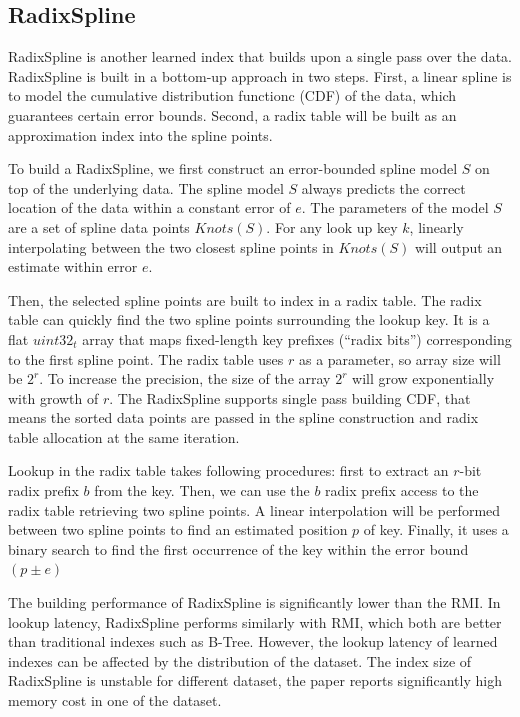 \subsection{RadixSpline}
RadixSpline \cite{Kipf:2020wr} is another learned index that builds upon a single pass over the data. RadixSpline is built in a bottom-up approach in two steps. First, a linear spline is to model the cumulative distribution functionc (CDF) of the data, which guarantees certain error bounds. Second, a radix table will be built as an approximation index into the spline points. 

To build a RadixSpline, we first construct an error-bounded spline model $S$ on top of the underlying data. The spline model $S$ always predicts the correct location of the data within a constant error of $e$. The parameters of the model $S$ are a set of spline data points $Knots(S)$. For any look up key $k$, linearly interpolating between the two closest spline points in $Knots(S)$ will output an estimate within error $e$. 

Then, the selected spline points are built to index in a radix table. The radix table can quickly find the two spline points surrounding the lookup key. It is a flat $uint32_t$ array that maps fixed-length key prefixes (“radix bits”) corresponding to the first spline point. The radix table uses $r$ as a parameter, so array size will be ${2^r}$. To increase the precision, the size of the array ${2^r}$ will grow exponentially with growth of $r$. The RadixSpline supports single pass building CDF, that means the sorted data points are passed in the spline construction and radix table allocation at the same iteration. 

Lookup in the radix table takes following procedures: first to extract an $r$-bit radix prefix $b$ from the key. Then, we can use the $b$ radix prefix access to the radix table retrieving two spline points. A linear interpolation will be performed between two spline points to find an estimated position $p$ of key. Finally, it uses a binary search to find the first occurrence of the key within the error bound $(p \pm e)$

The building performance of RadixSpline is significantly lower than the RMI. In lookup latency, RadixSpline performs similarly with RMI, which both are better than traditional indexes such as B-Tree. However, the lookup latency of learned indexes can be affected by the distribution of the dataset. The index size of RadixSpline is unstable for different dataset, the paper reports significantly high memory cost in one of the dataset. 

